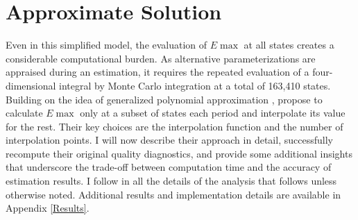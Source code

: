 \section{Approximate Solution}\label{Approximation}
Even in this simplified model, the evaluation of $E\max$ at all states creates a considerable computational burden. As alternative parameterizations are appraised during an estimation, it requires the repeated evaluation of a four-dimensional integral by Monte Carlo integration at a total of 163,410 states. Building on the idea of generalized polynomial approximation \citep{Bellman.1963}, \citet{Keane.1994} propose to calculate $E\max$ only at a subset of states each period and interpolate its value for the rest. Their key choices are the interpolation function and the number of interpolation points. I will now describe their approach in detail, successfully recompute their original quality diagnostics, and provide some additional insights that underscore the trade-off between computation time and the accuracy of estimation results. I follow \citet{Keane.1994} in all the details of the analysis that follows unless otherwise noted. Additional results and implementation details are available in Appendix \ref{Results}.
